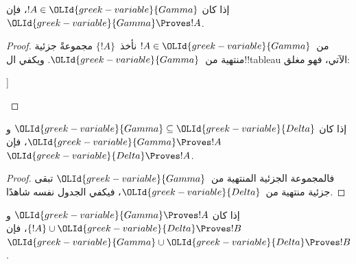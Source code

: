 \documentclass[../../../include/open-logic-section]{subfiles}
\begin{document}
\begin{prop}[الانعكاسية]
إذا كان $!A \in {\OLId{greek-variable}{Gamma}}$، فإن ${\OLId{greek-variable}{Gamma}} \Proves !A$.
\end{prop}

\begin{proof}
من~$!A \in {\OLId{greek-variable}{Gamma}}$ نأخذ~$\{!A\}$ مجموعةً جزئية منتهية
من~${\OLId{greek-variable}{Gamma}}$. ويكفي ال!!{tableau} الآتي، فهو مغلق:
\begin{oltableau}
  [\sFmla{\False}{\formula{A}}, just = \TAss
    [\sFmla{\True}{\formula{A}}, just = \TAss,close]
  ]
\end{oltableau}
\end{proof}
  

\begin{prop}[الرتابة]
إذا كان ${\OLId{greek-variable}{Gamma}} \subseteq {\OLId{greek-variable}{Delta}}$ و${\OLId{greek-variable}{Gamma}} \Proves !A$، فإن ${\OLId{greek-variable}{Delta}}
\Proves !A$.
\end{prop}

\begin{proof}
فالمجموعة الجزئية المنتهية من~${\OLId{greek-variable}{Gamma}}$ تبقى جزئية منتهية من~${\OLId{greek-variable}{Delta}}$،
فيكفي الجدول نفسه شاهدًا.
\end{proof}

\begin{prop}[التعدية]
إذا كان ${\OLId{greek-variable}{Gamma}} \Proves !A$ و$\{!A\} \cup
{\OLId{greek-variable}{Delta}} \Proves !B$، فإن ${\OLId{greek-variable}{Gamma}} \cup {\OLId{greek-variable}{Delta}} \Proves !B$.
\end{prop}
\end{document}
